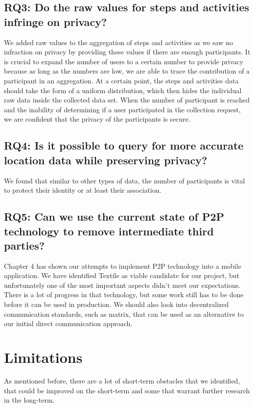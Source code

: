 \subsection*{RQ3: Do the raw values for steps and activities infringe on privacy?}
We added raw values to the aggregation of steps and activities as we saw no infraction on privacy by providing these values if there are enough participants. It is crucial to expand the number of users to a certain number to provide privacy because as long as the numbers are low, we are able to trace the contribution of a participant in an aggregation. At a certain point, the steps and activities data should take the form of a uniform distribution, which then hides the individual raw data inside the collected data set. When the number of participant is reached and the inability of determining if a user participated in the collection request, we are confident that the privacy of the participants is secure. 

\subsection*{RQ4: Is it possible to query for more accurate location data while preserving privacy?}
We found that similar to other types of data, the number of participants is vital to protect their identity or at least their association. 

\subsection*{RQ5: Can we use the current state of P2P technology to remove intermediate third parties?}
Chapter 4 has shown our attempts to implement P2P technology into a mobile application. We have identified Textile as viable candidate for our project, but unfortunately one of the most important aspects didn't meet our expectations. There is a lot of progress in that technology, but some work still has to be done before it can be used in production. We should also look into decentralized communication standards, such as matrix, that can be used as an alternative to our initial direct communication approach.

\section{Limitations}
As mentioned before, there are a lot of short-term obstacles that we identified, that could be improved on the short-term and some that warrant further research in the long-term.

